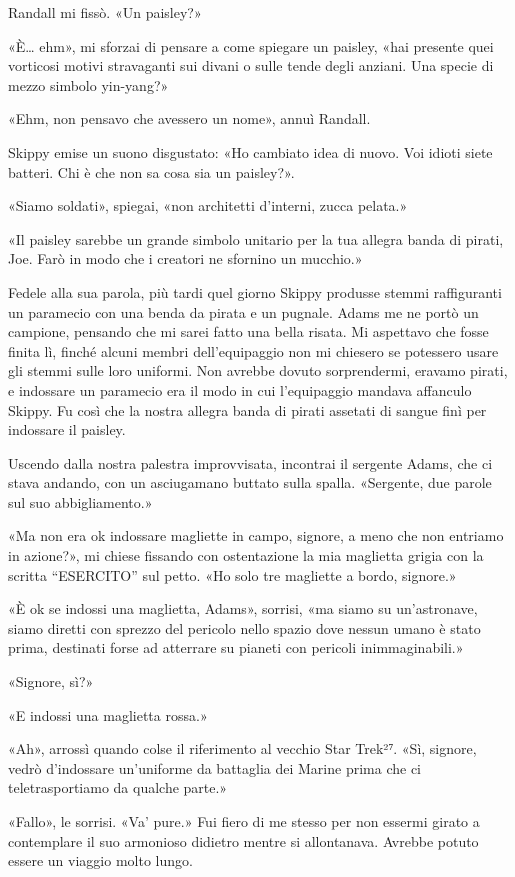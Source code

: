 Randall mi fissò. «Un paisley?»

«È\ldots{} ehm», mi sforzai di pensare a come spiegare un paisley, «hai
presente quei vorticosi motivi stravaganti sui divani o sulle tende
degli anziani. Una specie di mezzo simbolo yin-yang?»

«Ehm, non pensavo che avessero un nome», annuì Randall.

Skippy emise un suono disgustato: «Ho cambiato idea di nuovo. Voi idioti
siete batteri. Chi è che non sa cosa sia un paisley?».

«Siamo soldati», spiegai, «non architetti d'interni, zucca pelata.»

«Il paisley sarebbe un grande simbolo unitario per la tua allegra banda
di pirati, Joe. Farò in modo che i creatori ne sfornino un mucchio.»

Fedele alla sua parola, più tardi quel giorno Skippy produsse stemmi
raffiguranti un paramecio con una benda da pirata e un pugnale. Adams me
ne portò un campione, pensando che mi sarei fatto una bella risata. Mi
aspettavo che fosse finita lì, finché alcuni membri dell'equipaggio non
mi chiesero se potessero usare gli stemmi sulle loro uniformi. Non
avrebbe dovuto sorprendermi, eravamo pirati, e indossare un paramecio
era il modo in cui l'equipaggio mandava affanculo Skippy. Fu così che la
nostra allegra banda di pirati assetati di sangue finì per indossare il
paisley.

\hfill\break

Uscendo dalla nostra palestra improvvisata, incontrai il sergente Adams,
che ci stava andando, con un asciugamano buttato sulla spalla.
«Sergente, due parole sul suo abbigliamento.»

«Ma non era ok indossare magliette in campo, signore, a meno che non
entriamo in azione?», mi chiese fissando con ostentazione la mia
maglietta grigia con la scritta ``ESERCITO'' sul petto. «Ho solo tre
magliette a bordo, signore.»

«È ok se indossi una maglietta, Adams», sorrisi, «ma siamo su
un'astronave, siamo diretti con sprezzo del pericolo nello spazio dove
nessun umano è stato prima, destinati forse ad atterrare su pianeti con
pericoli inimmaginabili.»

«Signore, sì?»

«E indossi una maglietta rossa.»

«Ah», arrossì quando colse il riferimento al vecchio Star Trek²⁷. «Sì,
signore, vedrò d'indossare un'uniforme da battaglia dei Marine prima che
ci teletrasportiamo da qualche parte.»

«Fallo», le sorrisi. «Va' pure.» Fui fiero di me stesso per non essermi
girato a contemplare il suo armonioso didietro mentre si allontanava.
Avrebbe potuto essere un viaggio molto lungo.